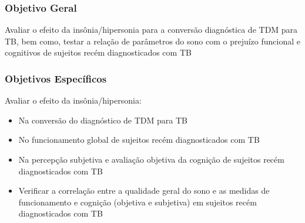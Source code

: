 \documentclass{beamer}
\begin{document}
\begin{frame}
    \frametitle{Objetivo Geral}

    \centering
    \Large
    Avaliar o efeito da insônia/hipersonia para a conversão diagnóstica de TDM para
    TB, bem como, testar a relação de parâmetros do sono com o prejuízo funcional
    e cognitivos de sujeitos recém diagnosticados com TB

    \end{frame}

\begin{frame}
    \frametitle{Objetivos Específicos}

    \begin{block}{Avaliar o efeito da insônia/hipersonia:}

        \begin{itemize}

            \item Na conversão do diagnóstico de TDM para TB
            \item No funcionamento global de sujeitos recém diagnosticados com TB
            \item Na percepção subjetiva e avaliação objetiva da cognição de
            sujeitos recém diagnosticados com TB

        \end{itemize}

    \end{block}

    \begin{block}
            
        \begin{itemize}

        \item Verificar a correlação entre a qualidade geral do sono e as medidas
        de funcionamento e cognição (objetiva e subjetiva) em sujeitos recém
        diagnosticados com TB

        \end{itemize}

    \end{block}
    
\end{frame}
\end{document}
